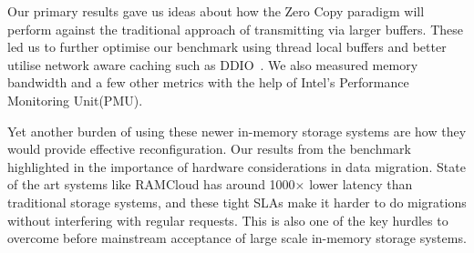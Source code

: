 Our primary results gave us ideas about how the Zero Copy paradigm will perform against
the traditional approach of transmitting via larger buffers. These led us to 
further optimise our benchmark using thread local buffers and better utilise network aware caching such as DDIO~\cite{ddio}. 
We also measured memory bandwidth and a few other metrics with the help of Intel\textregistered's Performance Monitoring Unit(PMU).

Yet another burden of using these newer in-memory storage systems are how they would provide effective 
reconfiguration. Our results from the benchmark highlighted in the importance of 
hardware considerations in data migration. State of the art systems like RAMCloud has around 1000$\times$
lower latency than traditional storage systems, and these tight SLAs make it harder to do migrations
without interfering with regular requests. This is also one of the key hurdles 
to overcome before mainstream acceptance of large scale in-memory storage systems.

